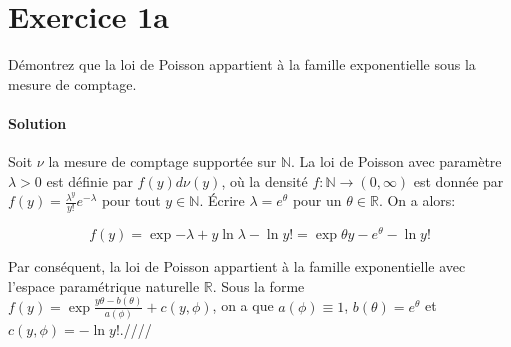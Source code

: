 \documentclass[../main.tex]{subfiles}
\begin{document}
\section{Exercice 1a}
\begin{CJK*}{UTF8}{gbsn}
Démontrez que la loi de Poisson appartient à la famille exponentielle sous la mesure de comptage.

\smallskip
\paragraph{Solution}
Soit $\nu$ la mesure de comptage supportée sur $\mathbb{N}$.
La loi de Poisson avec paramètre $\lambda > 0$ est définie par $f(y)d\nu(y)$, 
où la densité $f: \mathbb{N} \to (0, \infty)$ est donnée par $f(y) = \frac{\lambda^y}{y!}e^{-\lambda}$
pour tout $y \in \mathbb{N}$. Écrire $\lambda = e^{\theta}$ pour un $\theta \in \mathbb{R}$. On a alors:

\begin{equation*}
    f(y) = \exp{- \lambda + y \ln {\lambda} - \ln {y!}} = \exp{\theta y - e^{\theta} - \ln {y!}}
\end{equation*}

Par conséquent, la loi de Poisson appartient à la famille exponentielle avec l'espace paramétrique naturelle $\mathbb{R}$.
Sous la forme $f(y) = \exp{\frac{y \theta - b(\theta)}{a(\phi)} + c(y, \phi)}$, 
on a que $a(\phi) \equiv 1$, $b(\theta) = e^{\theta}$ et $c(y, \phi) = - \ln {y!}$.////

\end{CJK*}
\end{document}
